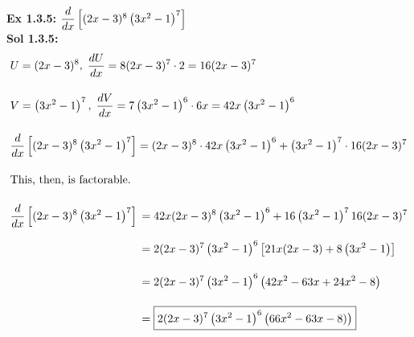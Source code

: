 \textbf{Ex 1.3.5: } $\dfrac{d}{dx} \left[(2x - 3)^8\left(3x^2 - 1\right)^7\right]$ \\[11pt]
\textbf{Sol 1.3.5: } \begin{align*}
    & U = (2x - 3)^8, \; \dfrac{dU}{dx} = 8(2x - 3)^7 \cdot 2 = 16(2x - 3)^7 \\[11pt]
    & V = \left(3x^2 - 1\right)^7, \; \dfrac{dV}{dx} = 7\left(3x^2 - 1\right)^6 \cdot 6x  = 42x\left(3x^2 - 1\right)^6\\[11pt]
    & \dfrac{d}{dx} \left[(2x - 3)^8\left(3x^2 - 1\right)^7\right] = (2x - 3)^8 \cdot 42x\left(3x^2 - 1\right)^6 + \left(3x^2 - 1\right)^7 \cdot 16(2x - 3)^7 \\[11pt]
    & \text{This, then, is factorable.} \\[11pt]
    & \dfrac{d}{dx} \left[(2x - 3)^8\left(3x^2 - 1\right)^7\right] \begin{aligned}[t]
        & = 42x(2x - 3)^8\left(3x^2 - 1\right)^6 + 16\left(3x^2 - 1\right)^7 16(2x - 3)^7 \\[11pt]
        & = 2(2x - 3)^7\left(3x^2 - 1\right)^6\left[21x(2x - 3) + 8\left(3x^2 - 1\right)\right] \\[11pt]
        & = 2(2x - 3)^7\left(3x^2 - 1\right)^6\left(42x^2 - 63x + 24x^2 - 8\right) \\[11pt]
        & = \boxed{2(2x - 3)^7\left(3x^2 - 1\right)^6\left(66x^2 - 63x - 8)\right)}
    \end{aligned}
\end{align*}



